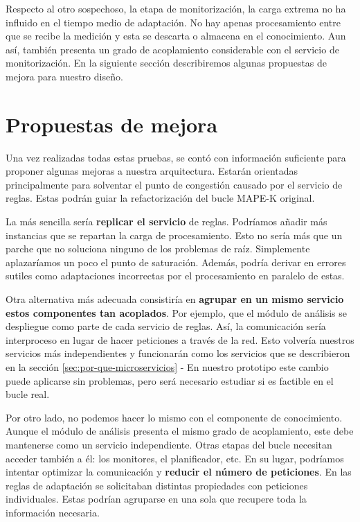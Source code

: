 Respecto al otro sospechoso, la etapa de monitorización, la carga extrema no ha influido en el tiempo medio de adaptación. No hay apenas procesamiento entre que se recibe la medición y esta se descarta o almacena en el conocimiento. Aun así, también presenta un grado de acoplamiento considerable con el servicio de monitorización. En la siguiente sección describiremos algunas propuestas de mejora para nuestro diseño.

\section{Propuestas de mejora}

Una vez realizadas todas estas pruebas, se contó con información suficiente para proponer algunas mejoras a nuestra arquitectura. Estarán orientadas principalmente para solventar el punto de congestión causado por el servicio de reglas. Estas podrán guiar la refactorización del bucle MAPE-K  original.

La más sencilla sería \textbf{replicar el servicio} de reglas. Podríamos añadir más instancias que se repartan la carga de procesamiento. Esto no sería más que un parche que no soluciona ninguno de los problemas de raíz. Simplemente aplazaríamos un poco el punto de saturación. Además, podría derivar en errores sutiles como adaptaciones incorrectas por el procesamiento en paralelo de estas.

Otra alternativa más adecuada consistiría en \textbf{agrupar en un mismo servicio estos componentes tan acoplados}. Por ejemplo, que el módulo de análisis se despliegue como parte de cada servicio de reglas. Así, la comunicación sería interproceso en lugar de hacer peticiones a través de la red. Esto volvería nuestros servicios más independientes y funcionarán como los servicios  que se describieron en la sección \ref{sec:por-que-microservicios} -  En nuestro prototipo este cambio puede aplicarse sin problemas, pero será necesario estudiar si es factible en el bucle real.

Por otro lado, no podemos hacer lo mismo con el componente de conocimiento. Aunque el módulo de análisis presenta el mismo grado de acoplamiento, este debe mantenerse como un servicio independiente. Otras etapas del bucle necesitan acceder también a él: los monitores, el planificador, etc. En su lugar, podríamos intentar optimizar la comunicación y \textbf{reducir el número de peticiones}. En las reglas de adaptación se solicitaban distintas propiedades con peticiones individuales. Estas podrían agruparse en una sola que recupere toda la información necesaria.

